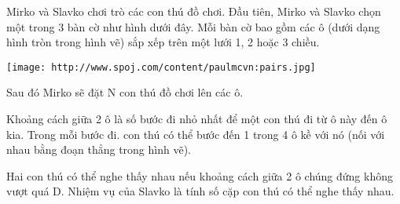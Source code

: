 Mirko và Slavko chơi trò các con thú đồ chơi. Đầu tiên, Mirko và Slavko chọn một trong 3 bàn cờ như hình dưới đây. Mỗi bàn cờ bao gồm các ô (dưới dạng hình tròn trong hình vẽ) sắp xếp trên một lưới 1, 2 hoặc 3 chiều.  


\texttt{[image: http://www.spoj.com/content/paulmcvn:pairs.jpg]}

   Sau đó Mirko sẽ đặt N con thú đồ chơi lên các ô.  

   Khoảng cách giữa 2 ô là số bước đi nhỏ nhất để một con thú đi từ ô này đến ô kia. Trong mỗi bước đi. con thú có thể bước đến 1 trong 4 ô kề với nó (nối với nhau bằng đoạn thẳng trong hình vẽ).  

   Hai con thú có thể nghe thấy nhau nếu khoảng cách giữa 2 ô chúng đứng không vượt quá D. Nhiệm vụ của Slavko là tính số cặp con thú có thể nghe thấy nhau.